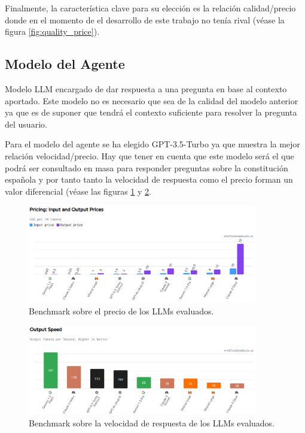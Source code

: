 Finalmente, la característica clave para su elección es la relación calidad/precio donde en el momento de el desarrollo de este trabajo no tenía rival (véase la figura \ref{fig:quality_price}).


\subsection{Modelo del Agente}

Modelo LLM encargado de dar respuesta a una pregunta en base al contexto aportado. Este modelo no es necesario que sea de la calidad del modelo anterior ya que es de suponer que tendrá el contexto suficiente para resolver la pregunta del usuario.

Para el modelo del agente se ha elegido GPT-3.5-Turbo ya que muestra la mejor relación velocidad/precio. Hay que tener en cuenta que este modelo será el que podrá ser consultado en masa para responder preguntas sobre la constitución española y por tanto tanto la velocidad de respuesta como el precio forman un valor diferencial (véase las figuras \ref{fig:pricing} y \ref{fig:speed}.


\begin{figure}[h]
\centering
\includegraphics[width=0.9\textwidth]{figuras/capitulo6/pricing.png}
\caption{Benchmark sobre el precio de los LLMs evaluados. \citep{artificialanalysis}}
\label{fig:pricing}
\end{figure}

\begin{figure}[h]
\centering
\includegraphics[width=0.9\textwidth]{figuras/capitulo6/speed.png}
\caption{Benchmark sobre la velocidad de respuesta de los LLMs evaluados. \citep{artificialanalysis}}
\label{fig:speed}
\end{figure}

